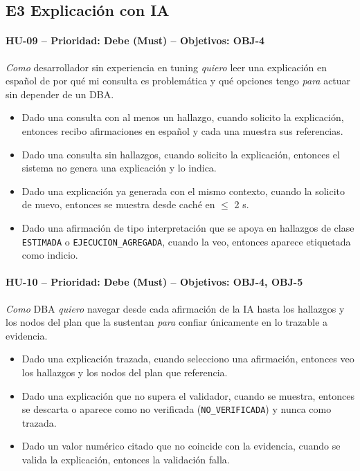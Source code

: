 \documentclass[11pt,a4paper]{report}
\begin{document}
\subsection{E3 Explicación con IA}
\paragraph{HU-09 -- Prioridad: Debe (Must) -- Objetivos: OBJ-4}
\textit{Como} desarrollador sin experiencia en tuning \textit{quiero} leer una explicación en español de por qué mi consulta es problemática y qué opciones tengo \textit{para} actuar sin depender de un DBA.
\begin{itemize}[leftmargin=1.3em,itemsep=1pt]
\item[\textbf{CA-HU09.1}] Dado una consulta con al menos un hallazgo, cuando solicito la explicación, entonces recibo afirmaciones en español y cada una muestra sus referencias.
\item[\textbf{CA-HU09.2}] Dado una consulta sin hallazgos, cuando solicito la explicación, entonces el sistema no genera una explicación y lo indica.
\item[\textbf{CA-HU09.3}] Dado una explicación ya generada con el mismo contexto, cuando la solicito de nuevo, entonces se muestra desde caché en $\leq$ 2 s.
\item[\textbf{CA-HU09.4}] Dado una afirmación de tipo interpretación que se apoya en hallazgos de clase \texttt{ESTIMADA} o \texttt{EJECUCION\_AGREGADA}, cuando la veo, entonces aparece etiquetada como indicio.
\end{itemize}

\paragraph{HU-10 -- Prioridad: Debe (Must) -- Objetivos: OBJ-4, OBJ-5}
\textit{Como} DBA \textit{quiero} navegar desde cada afirmación de la IA hasta los hallazgos y los nodos del plan que la sustentan \textit{para} confiar únicamente en lo trazable a evidencia.
\begin{itemize}[leftmargin=1.3em,itemsep=1pt]
\item[\textbf{CA-HU10.1}] Dado una explicación trazada, cuando selecciono una afirmación, entonces veo los hallazgos y los nodos del plan que referencia.
\item[\textbf{CA-HU10.2}] Dado una explicación que no supera el validador, cuando se muestra, entonces se descarta o aparece como no verificada (\texttt{NO\_VERIFICADA}) y nunca como trazada.
\item[\textbf{CA-HU10.3}] Dado un valor numérico citado que no coincide con la evidencia, cuando se valida la explicación, entonces la validación falla.
\end{itemize}
\end{document}
